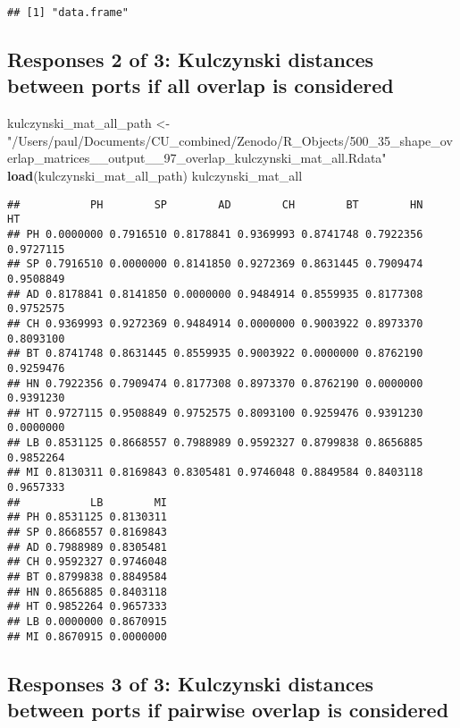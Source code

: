 \documentclass[]{article}
\newenvironment{Shaded}{\begin{snugshade}}{\end{snugshade}}
\newcommand{\KeywordTok}[1]{\textcolor[rgb]{0.13,0.29,0.53}{\textbf{#1}}}
\newcommand{\StringTok}[1]{\textcolor[rgb]{0.31,0.60,0.02}{#1}}
\newcommand{\NormalTok}[1]{#1}
\begin{document}
\begin{verbatim}
## [1] "data.frame"
\end{verbatim}

\subsection{Responses 2 of 3: Kulczynski distances between ports if all
overlap is
considered}\label{responses-2-of-3-kulczynski-distances-between-ports-if-all-overlap-is-considered}

\begin{Shaded}
\begin{Highlighting}[]
\NormalTok{kulczynski_mat_all_path <-}\StringTok{ "/Users/paul/Documents/CU_combined/Zenodo/R_Objects/500_35_shape_overlap_matrices__output__97_overlap_kulczynski_mat_all.Rdata"}
\KeywordTok{load}\NormalTok{(kulczynski_mat_all_path)}
\NormalTok{kulczynski_mat_all}
\end{Highlighting}
\end{Shaded}

\begin{verbatim}
##           PH        SP        AD        CH        BT        HN        HT
## PH 0.0000000 0.7916510 0.8178841 0.9369993 0.8741748 0.7922356 0.9727115
## SP 0.7916510 0.0000000 0.8141850 0.9272369 0.8631445 0.7909474 0.9508849
## AD 0.8178841 0.8141850 0.0000000 0.9484914 0.8559935 0.8177308 0.9752575
## CH 0.9369993 0.9272369 0.9484914 0.0000000 0.9003922 0.8973370 0.8093100
## BT 0.8741748 0.8631445 0.8559935 0.9003922 0.0000000 0.8762190 0.9259476
## HN 0.7922356 0.7909474 0.8177308 0.8973370 0.8762190 0.0000000 0.9391230
## HT 0.9727115 0.9508849 0.9752575 0.8093100 0.9259476 0.9391230 0.0000000
## LB 0.8531125 0.8668557 0.7988989 0.9592327 0.8799838 0.8656885 0.9852264
## MI 0.8130311 0.8169843 0.8305481 0.9746048 0.8849584 0.8403118 0.9657333
##           LB        MI
## PH 0.8531125 0.8130311
## SP 0.8668557 0.8169843
## AD 0.7988989 0.8305481
## CH 0.9592327 0.9746048
## BT 0.8799838 0.8849584
## HN 0.8656885 0.8403118
## HT 0.9852264 0.9657333
## LB 0.0000000 0.8670915
## MI 0.8670915 0.0000000
\end{verbatim}

\subsection{Responses 3 of 3: Kulczynski distances between ports if
pairwise overlap is
considered}\label{responses-3-of-3-kulczynski-distances-between-ports-if-pairwise-overlap-is-considered}
\end{document}
